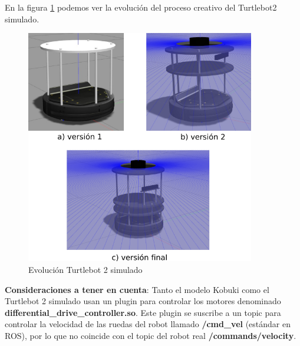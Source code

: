 En la figura \ref{fig:evolucion_turtlebot2_sim} podemos ver la evolución del proceso creativo del Turtlebot2 simulado.
\begin{figure} [H]
  \begin{center}
    \includegraphics[width=10cm]{imagenes/creacion-turtlebot2-sim.png}
  \end{center}
  \caption[Evolución Turtlebot 2 simulado]{Evolución Turtlebot 2 simulado}
  \label{fig:evolucion_turtlebot2_sim}
\end{figure}


\textbf{Consideraciones a tener en cuenta}: Tanto el modelo Kobuki como el Turtlebot 2 simulado usan un plugin para controlar los motores denominado \textbf{differential\_drive\_controller.so}. Este plugin se suscribe a un topic para controlar la velocidad de las ruedas del robot llamado \textbf{/cmd\_vel} (estándar en ROS), por lo que no coincide con el topic del robot real \textbf{/commands/velocity}. 


